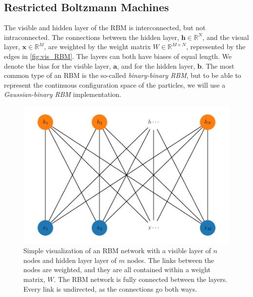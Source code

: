 \subsection{Restricted Boltzmann Machines}
The visible and hidden layer of the RBM is interconnected, but not intraconnected. The connections between the hidden layer, $\bm{h}\in\mathbb{R}^N$, and the visual layer, $\bm{x}\in\mathbb{R}^M$, are weighted by the weight matrix $W\in\mathbb{R}^{M\times N}$, represented by the edges in \autoref{fig:vis_RBM}. The layers can both have biases of equal length. We denote the bias for the visible layer, $\bm{a}$, and for the hidden layer, $\bm{b}$. 
The most common type of an RBM is the so-called \textit{binary-binary RBM}, but to be able to represent the continuous configuration space of the particles, we will use a \textit{Gaussian-binary RBM} implementation. 


\begin{figure}[H]
\begin{center}\includegraphics[scale=0.8]{latex/latex-report/Images/rbm_visualize.pdf}
\end{center}
\caption{Simple visualization of an RBM network with a visible layer of $n$ nodes and hidden layer layer of $m$ nodes. The links between the nodes are weighted, and they are all contained within a weight matrix, $W$. The RBM network is fully connected between the layers. Every link is undirected, as the connections go both ways.}
\label{fig:vis_RBM}
\end{figure}


